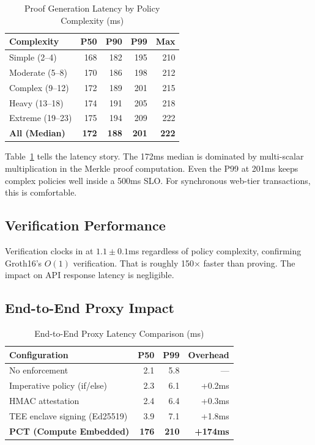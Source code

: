 \documentclass[10pt,conference]{IEEEtran}
\begin{document}
\begin{table}[t]
\centering
\caption{Proof Generation Latency by Policy Complexity (ms)}
\label{tab:latency}
\begin{tabular}{@{}lrrrr@{}}
\toprule
\textbf{Complexity} & \textbf{P50} & \textbf{P90} & \textbf{P99} & \textbf{Max} \\
\midrule
Simple (2--4) & 168 & 182 & 195 & 210 \\
Moderate (5--8) & 170 & 186 & 198 & 212 \\
Complex (9--12) & 172 & 189 & 201 & 215 \\
Heavy (13--18) & 174 & 191 & 205 & 218 \\
Extreme (19--23) & 175 & 194 & 209 & 222 \\
\midrule
\textbf{All (Median)} & \textbf{172} & \textbf{188} & \textbf{201} & \textbf{222} \\
\bottomrule
\end{tabular}
\end{table}

Table~\ref{tab:latency} tells the latency story. The 172ms median is dominated by multi-scalar multiplication in the Merkle proof computation. Even the P99 at 201ms keeps complex policies well inside a 500ms SLO. For synchronous web-tier transactions, this is comfortable.

\subsection{Verification Performance}

Verification clocks in at $1.1 \pm 0.1$ms regardless of policy complexity, confirming Groth16's $O(1)$ verification. That is roughly 150$\times$ faster than proving. The impact on API response latency is negligible.

\subsection{End-to-End Proxy Impact}

\begin{table}[t]
\centering
\caption{End-to-End Proxy Latency Comparison (ms)}
\label{tab:e2e}
\begin{tabular}{@{}lrrr@{}}
\toprule
\textbf{Configuration} & \textbf{P50} & \textbf{P99} & \textbf{Overhead} \\
\midrule
No enforcement & 2.1 & 5.8 & --- \\
Imperative policy (if/else) & 2.3 & 6.1 & +0.2ms \\
HMAC attestation & 2.4 & 6.4 & +0.3ms \\
TEE enclave signing (Ed25519) & 3.9 & 7.1 & +1.8ms \\
\textbf{PCT (Compute Embedded)} & \textbf{176} & \textbf{210} & \textbf{+174ms} \\
\bottomrule
\end{tabular}
\end{table}
\end{document}
